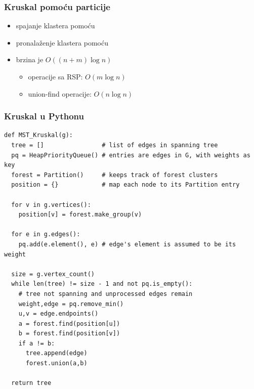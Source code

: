 \documentclass[compress,aspectratio=169]{beamer}
\begin{document}
\begin{frame}[fragile]
  \frametitle{Kruskal pomoću particije}
  \begin{itemize}
    \item spajanje klastera pomoću 
    \item pronalaženje klastera pomoću 
    \item brzina je $O((n+m)\log n)$
    \begin{itemize}
      \item operacije sa RSP: $O(m\log n)$
      \item union-find operacije: $O(n\log n)$
    \end{itemize}
  \end{itemize}
\end{frame}

\begin{frame}
  \frametitle{Kruskal u Pythonu}
\begin{verbatim}
def MST_Kruskal(g):
  tree = []                # list of edges in spanning tree
  pq = HeapPriorityQueue() # entries are edges in G, with weights as key
  forest = Partition()     # keeps track of forest clusters
  position = {}            # map each node to its Partition entry

  for v in g.vertices():
    position[v] = forest.make_group(v)

  for e in g.edges():
    pq.add(e.element(), e) # edge's element is assumed to be its weight

  size = g.vertex_count()
  while len(tree) != size - 1 and not pq.is_empty():
    # tree not spanning and unprocessed edges remain
    weight,edge = pq.remove_min()
    u,v = edge.endpoints()
    a = forest.find(position[u])
    b = forest.find(position[v])
    if a != b:
      tree.append(edge)
      forest.union(a,b)

  return tree
\end{verbatim}
\end{frame}
\end{document}
